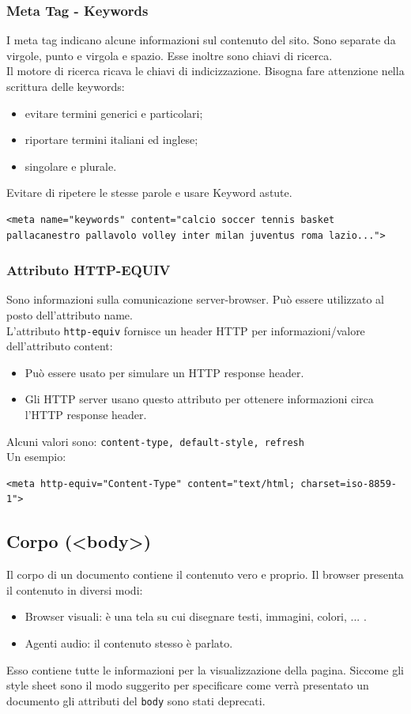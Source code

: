 \documentclass{article}
\begin{document}
\subsubsection{Meta Tag - Keywords}
I meta tag indicano alcune informazioni sul contenuto del sito. Sono separate da virgole, punto e virgola e spazio.
Esse inoltre sono chiavi di ricerca.
\\ Il motore di ricerca ricava le chiavi di indicizzazione. Bisogna fare attenzione nella scrittura delle keywords:
\begin{itemize}
    \item evitare termini generici e particolari;
    \item riportare termini italiani ed inglese;
    \item singolare e plurale.
\end{itemize}
Evitare di ripetere le stesse parole e usare Keyword astute.

\begin{lstlisting}[style=htmlstyle]
<meta name="keywords" content="calcio soccer tennis basket pallacanestro pallavolo volley inter milan juventus roma lazio...">
\end{lstlisting}
\subsubsection{Attributo HTTP-EQUIV}
Sono informazioni sulla comunicazione server-browser. Può essere utilizzato al posto dell'attributo name.
\\ L'attributo \texttt{http-equiv} fornisce un header HTTP per informazioni/valore dell'attributo content:
\begin{itemize}
    \item Può essere usato per simulare un HTTP response header.
    \item Gli HTTP server usano questo attributo per ottenere informazioni circa l'HTTP response header.
\end{itemize}
Alcuni valori sono: \texttt{content-type, default-style, refresh}
\\ Un esempio:
\begin{lstlisting}[style=htmlstyle]
<meta http-equiv="Content-Type" content="text/html; charset=iso-8859-1">
\end{lstlisting}
\subsection{Corpo (<body>)}
Il corpo di un documento contiene il contenuto vero e proprio. Il browser presenta il contenuto in diversi modi:
\begin{itemize}
    \item Browser visuali: è una tela su cui disegnare testi, immagini, colori, ... .
    \item Agenti audio: il contenuto stesso è parlato.
\end{itemize}
Esso contiene tutte le informazioni per la visualizzazione della pagina. Siccome gli style sheet sono il modo suggerito per specificare come verrà presentato un documento
gli attributi del \texttt{body} sono stati deprecati.
\end{document}
